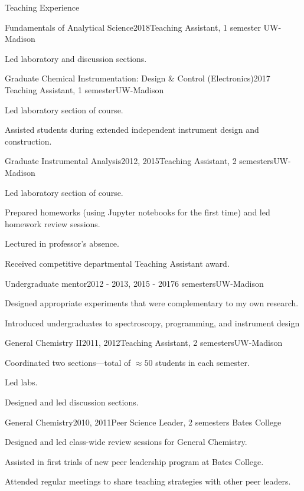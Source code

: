 \documentclass{resume}  %
\begin{document}
\clearpage

\begin{rSection}{Teaching Experience}
  \begin{rSubsection}{Fundamentals of Analytical Science}{2018}{Teaching Assistant, 1 semester}
    {UW-Madison}
    \item Led laboratory and discussion sections.
  \end{rSubsection}
  \begin{rSubsection}{Graduate Chemical Instrumentation: Design \& Control (Electronics)}{2017}
    {Teaching Assistant, 1 semester}{UW-Madison}
    \item Led laboratory section of course.
    \item Assisted students during extended independent instrument design and construction.
  \end{rSubsection}
  \begin{rSubsection}{Graduate Instrumental Analysis}{2012, 2015}{Teaching Assistant, 2
      semesters}{UW-Madison}
    \item Led laboratory section of course.
    \item Prepared homeworks (using Jupyter notebooks for the first time) and led homework review
      sessions.
    \item Lectured in professor's absence.
    \item Received competitive departmental Teaching Assistant award.
  \end{rSubsection}
  \begin{rSubsection}{Undergraduate mentor}{2012 - 2013, 2015 - 2017}{6 semesters}{UW-Madison}
    \item Designed appropriate experiments that were complementary to my own research.
    \item Introduced undergraduates to spectroscopy, programming, and instrument design
  \end{rSubsection}
  \begin{rSubsection}{General Chemistry II}{2011, 2012}{Teaching Assistant, 2
      semesters}{UW-Madison}
    \item Coordinated two sections---total of $\approx50$ students in each semester.
    \item Led labs.
    \item Designed and led discussion sections.
  \end{rSubsection}
  \begin{rSubsection}{General Chemistry}{2010, 2011}{Peer Science Leader, 2 semesters}
    {Bates College}
    \item Designed and led class-wide review sessions for General Chemistry.
    \item Assisted in first trials of new peer leadership program at Bates College.
    \item Attended regular meetings to share teaching strategies with other peer leaders.
  \end{rSubsection}
\end{rSection}
\end{document}
